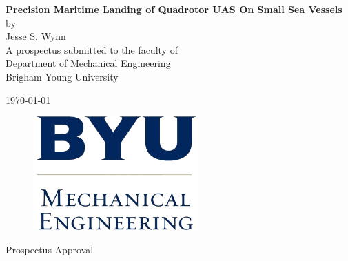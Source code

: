 \documentclass[12pt, letterpaper]{article}
\begin{document}
\begin{titlepage}

\begin{center}

\vspace*{\fill}

\vspace{0.5in}

{ \LARGE \bfseries Precision Maritime Landing of Quadrotor UAS On Small Sea Vessels}\\[.25in]

\large
by\\[.25 in]
Jesse S. Wynn\\[1in]

A prospectus submitted to the faculty of\\
Department of Mechanical Engineering\\
Brigham Young University

\vspace{1in}

\today

\vspace*{\fill}

\end{center}

\end{titlepage}

\thispagestyle{empty}

\begin{center}
\vspace*{\fill}

\begin{figure}[htbp] %
   \centering
   \includegraphics[width=2.5in]{byume_logo_clear.jpg} 
\end{figure}

\vspace{0.5in}

\Large{Prospectus Approval}\\[0.5in]

\end{center}
\end{document}
